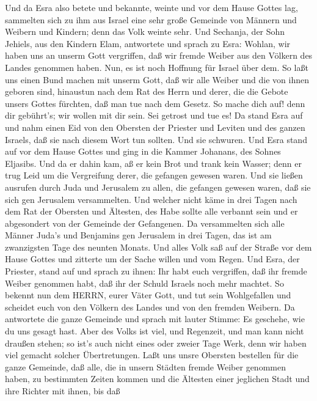  Und da Esra also betete und bekannte, weinte und vor dem
Hause Gottes lag, sammelten sich zu ihm aus Israel eine sehr große
Gemeinde von Männern und Weibern und Kindern; denn das Volk weinte sehr.
 Und Sechanja, der Sohn Jehiels, aus den Kindern Elam,
antwortete und sprach zu Esra: Wohlan, wir haben uns an unserm Gott
vergriffen, daß wir fremde Weiber aus den Völkern des Landes genommen
haben. Nun, es ist noch Hoffnung für Israel über dem.  So
laßt uns einen Bund machen mit unserm Gott, daß wir alle Weiber und die
von ihnen geboren sind, hinaustun nach dem Rat des Herrn und derer, die
die Gebote unsers Gottes fürchten, daß man tue nach dem Gesetz.
 So mache dich auf! denn dir gebührt's; wir wollen mit dir
sein. Sei getrost und tue es!  Da stand Esra auf und nahm
einen Eid von den Obersten der Priester und Leviten und des ganzen
Israels, daß sie nach diesem Wort tun sollten. Und sie schwuren.
 Und Esra stand auf vor dem Hause Gottes und ging in die
Kammer Johanans, des Sohnes Eljasibs. Und da er dahin kam, aß er kein
Brot und trank kein Wasser; denn er trug Leid um die Vergreifung derer,
die gefangen gewesen waren.  Und sie ließen ausrufen durch
Juda und Jerusalem zu allen, die gefangen gewesen waren, daß sie sich
gen Jerusalem versammelten.  Und welcher nicht käme in drei
Tagen nach dem Rat der Obersten und Ältesten, des Habe sollte alle
verbannt sein und er abgesondert von der Gemeinde der Gefangenen.
 Da versammelten sich alle Männer Juda's und Benjamins gen
Jerusalem in drei Tagen, das ist am zwanzigsten Tage des neunten Monats.
Und alles Volk saß auf der Straße vor dem Hause Gottes und zitterte um
der Sache willen und vom Regen.  Und Esra, der Priester,
stand auf und sprach zu ihnen: Ihr habt euch vergriffen, daß ihr fremde
Weiber genommen habt, daß ihr der Schuld Israels noch mehr machtet.
 So bekennt nun dem HERRN, eurer Väter Gott, und tut sein
Wohlgefallen und scheidet euch von den Völkern des Landes und von den
fremden Weibern.  Da antwortete die ganze Gemeinde und
sprach mit lauter Stimme: Es geschehe, wie du uns gesagt hast.
 Aber des Volks ist viel, und Regenzeit, und man kann nicht
draußen stehen; so ist's auch nicht eines oder zweier Tage Werk, denn
wir haben viel gemacht solcher Übertretungen.  Laßt uns
unsre Obersten bestellen für die ganze Gemeinde, daß alle, die in unsern
Städten fremde Weiber genommen haben, zu bestimmten Zeiten kommen und
die Ältesten einer jeglichen Stadt und ihre Richter mit ihnen, bis daß
